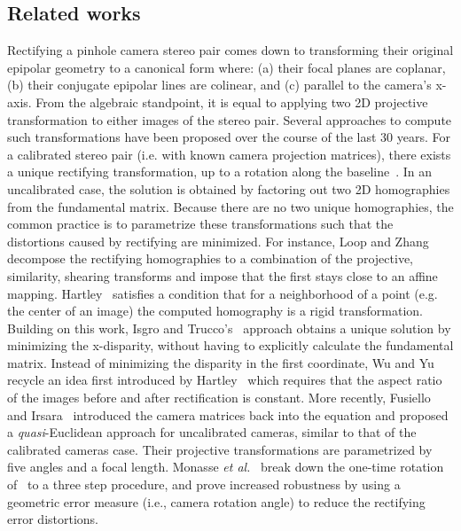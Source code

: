 \documentclass{ipol}
\begin{document}
\subsection{Related works}
Rectifying a pinhole camera stereo pair comes down to transforming their original epipolar geometry to a canonical form where: (a) their focal planes are coplanar, (b) their conjugate epipolar lines are colinear, and (c) parallel to the camera's x-axis. 
From the algebraic standpoint, it is equal to applying two 2D projective transformation to either images of the stereo pair. Several approaches to compute such transformations have been proposed over the course of the last 30 years. For a calibrated stereo pair (i.e. with known camera projection matrices), there exists a unique rectifying transformation, up to a rotation along the baseline~\cite{fusiello2000epi}. In an uncalibrated case, the solution is obtained by factoring out two 2D homographies from the fundamental matrix. Because there are no two unique homographies, the common practice is to parametrize these transformations such that the distortions caused by rectifying are minimized. For instance, Loop and Zhang~\cite{loop1999epi} decompose the rectifying homographies to a combination of the projective, similarity, shearing transforms and impose that the first stays close to an affine mapping. Hartley~\cite{hartley1999epi} satisfies a condition that for a neighborhood of a point (e.g. the center of an image) the computed homography is a rigid transformation. Building on this work, Isgro and Trucco's~\cite{isgro1999epi} approach obtains a unique solution by minimizing the x-disparity, without having to explicitly calculate the fundamental matrix. Instead of minimizing the disparity in the first coordinate, Wu and Yu~\cite{wu2005epi} recycle an idea first introduced by Hartley~\cite{hartley1999epi} which requires that the aspect ratio of the images before and after rectification is constant. More recently, Fusiello and Irsara~\cite{fusiello2008epi} introduced the camera matrices back into the equation and proposed a \textit{quasi}-Euclidean approach for uncalibrated cameras, similar to that of the calibrated cameras case. Their projective transformations are parametrized by five angles and a focal length. Monasse \textit{et al.}~\cite{monasse2010epi} break down the one-time rotation of~\cite{fusiello2008epi} to a three step procedure, and prove increased robustness by using a geometric error measure (i.e., camera rotation angle) to reduce the rectifying error distortions.
\end{document}
